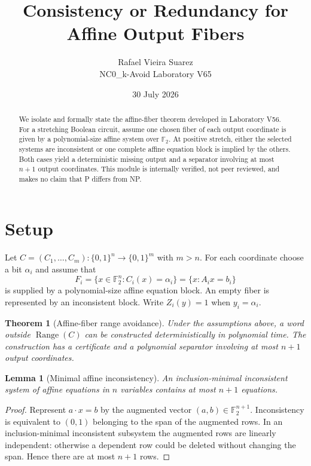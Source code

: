 \documentclass[11pt]{article}
\title{Consistency or Redundancy for Affine Output Fibers}
\author{Rafael Vieira Suarez\\NC0\_k-Avoid Laboratory V65}
\date{30 July 2026}
\newtheorem{theorem}{Theorem}
\newtheorem{lemma}{Lemma}
\newcommand{\F}{\mathbb F_2}
\newcommand{\Range}{\operatorname{Range}}
\begin{document}
\maketitle

\begin{abstract}
We isolate and formally state the affine-fiber theorem developed in Laboratory V56. For a stretching Boolean circuit, assume one chosen fiber of each output coordinate is given by a polynomial-size affine system over $\F$. At positive stretch, either the selected systems are inconsistent or one complete affine equation block is implied by the others. Both cases yield a deterministic missing output and a separator involving at most $n+1$ output coordinates. This module is internally verified, not peer reviewed, and makes no claim that P differs from NP.
\end{abstract}

\section{Setup}
Let $C=(C_1,\ldots,C_m):\{0,1\}^n\to\{0,1\}^m$ with $m>n$. For each coordinate choose a bit $\alpha_i$ and assume that
\[
F_i=\{x\in\F^n:C_i(x)=\alpha_i\}=\{x:A_i x=b_i\}
\]
is supplied by a polynomial-size affine equation block. An empty fiber is represented by an inconsistent block. Write $Z_i(y)=1$ when $y_i=\alpha_i$.

\begin{theorem}[Affine-fiber range avoidance]\label{thm:main}
Under the assumptions above, a word outside $\Range(C)$ can be constructed deterministically in polynomial time. The construction has a certificate and a polynomial separator involving at most $n+1$ output coordinates.
\end{theorem}

\begin{lemma}[Minimal affine inconsistency]\label{lem:mis}
An inclusion-minimal inconsistent system of affine equations in $n$ variables contains at most $n+1$ equations.
\end{lemma}
\begin{proof}
Represent $a\cdot x=b$ by the augmented vector $(a,b)\in\F^{n+1}$. Inconsistency is equivalent to $(0,1)$ belonging to the span of the augmented rows. In an inclusion-minimal inconsistent subsystem the augmented rows are linearly independent: otherwise a dependent row could be deleted without changing the span. Hence there are at most $n+1$ rows.
\end{proof}
\end{document}
